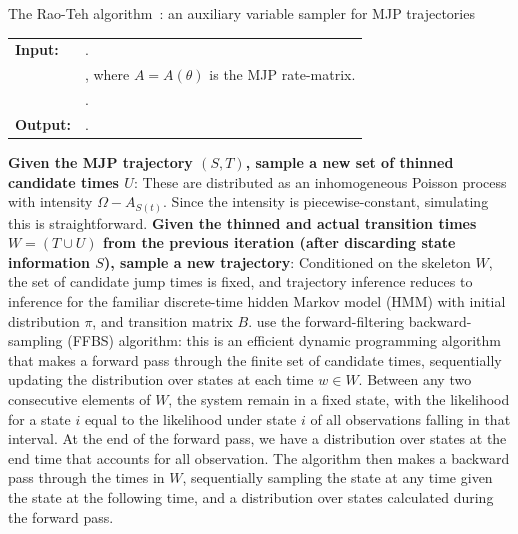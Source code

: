 \begin{algorithm}[H]
  \caption{The Rao-Teh algorithm~\cite{RaoTeh13}: an auxiliary variable sampler for MJP trajectories}
   \label{alg:Unif_gibbs}
  \begin{tabular}{l l}
   \textbf{Input:  } & \text{MJP parameters $\theta$; a set of partial and noisy observations $X$}. \\
                     & \text{A  parameter $\Omega > \max_i A_s$}, where
   $A = A(\theta)$ is the MJP rate-matrix.\\
                      & \text{The previous MJP path $S(t) = (S, T)$}.\\ 
   \textbf{Output:  }& \text{A new MJP trajectory $\tilde{S} (t) = (\tilde{S}, \tilde{T})$}.\\
   \hline
   \end{tabular}
   \begin{algorithmic}[1]
\State \textbf{Given the MJP trajectory $(S,T)$, sample a new set of thinned 
candidate times $U$}: %
These are distributed as an inhomogeneous Poisson process with intensity 
$\Omega-A_{S(t)}$. Since the intensity is piecewise-constant, simulating this 
is straightforward.
\State \textbf{Given the thinned and actual transition times $W = (T \cup U)$
from the previous iteration (after discarding state information $S$), 
sample a new trajectory}:
    Conditioned on the skeleton $W$, the set of candidate jump
    times is fixed, and trajectory inference reduces to inference for
    the familiar discrete-time hidden Markov model (HMM) with initial distribution
    $\pi$, and transition matrix $B$. \cite{RaoTeh13} use the forward-filtering
    backward-sampling (FFBS) algorithm: this is an efficient dynamic 
    programming algorithm that makes a forward pass through the
    finite set of candidate times, sequentially updating the 
    distribution over states at each time $w \in W$. 
    Between any two consecutive elements of $W$,
    the system remain in a fixed state, with the likelihood for a state $i$ equal
    to the likelihood under state $i$ of all observations 
    falling in that interval. 
    At the end of the forward pass, we have a distribution over states at the
    end time that accounts for all observation.
    The algorithm then makes a backward pass through the times in $W$, 
    sequentially sampling the state at any time given the state at the 
    following time, and a distribution over states calculated during the
    forward pass. 
\end{algorithmic}
\end{algorithm}

